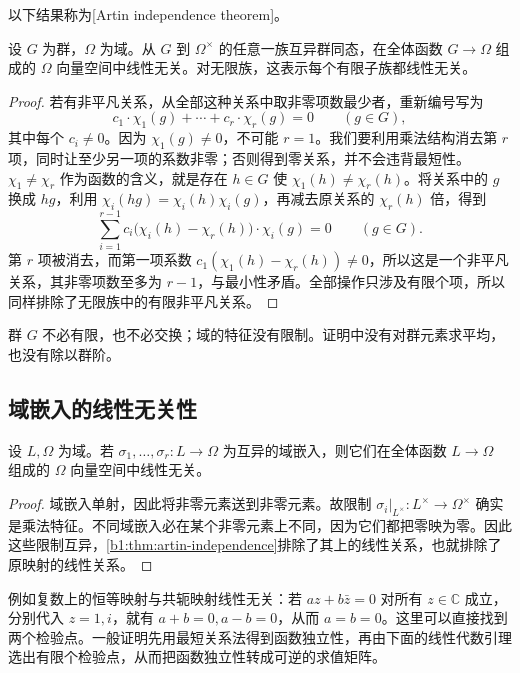 \ProseParagraphBreak
以下结果称为[Artin independence theorem]。
\begin{theorem}[Artin]\label{b1:thm:artin-independence}
	设 \(G\) 为群，\(\Omega\) 为域。从 \(G\) 到 \(\Omega^\times\) 的任意一族互异群同态，在全体函数 \(G\rightarrow\Omega\) 组成的 \(\Omega\) 向量空间中线性无关。对无限族，这表示每个有限子族都线性无关。
\end{theorem}
\begin{proof}
	若有非平凡关系，从全部这种关系中取非零项数最少者，重新编号写为
	\[
		c_1\cdot\chi_1(g)+\cdots+c_r\cdot\chi_r(g)=0\qquad(g\in G),
	\]
	其中每个 \(c_i\ne0\)。因为 \(\chi_1(g)\ne0\)，不可能 \(r=1\)。我们要利用乘法结构消去第 \(r\) 项，同时让至少另一项的系数非零；否则得到零关系，并不会违背最短性。\(\chi_1\ne\chi_r\) 作为函数的含义，就是存在 \(h\in G\) 使 \(\chi_1(h)\ne\chi_r(h)\)。将关系中的 \(g\) 换成 \(hg\)，利用 \(\chi_i(hg)=\chi_i(h)\chi_i(g)\)，再减去原关系的 \(\chi_r(h)\) 倍，得到
	\[
		\sum_{i=1}^{r-1}c_i\bigl(\chi_i(h)-\chi_r(h)\bigr)\cdot\chi_i(g)=0 \qquad(g\in G).
	\]
	第 \(r\) 项被消去，而第一项系数 \(c_1(\chi_1(h)-\chi_r(h))\ne0\)，所以这是一个非平凡关系，其非零项数至多为 \(r-1\)，与最小性矛盾。全部操作只涉及有限个项，所以同样排除了无限族中的有限非平凡关系。
\end{proof}
群 \(G\) 不必有限，也不必交换；域的特征没有限制。证明中没有对群元素求平均，也没有除以群阶。

\subsection{域嵌入的线性无关性}
\label{b1:subsec:1801:02}

\begin{corollary}\label{b1:cor:embedding-independence}
	设 \(L,\Omega\) 为域。若 \(\sigma_1,\ldots,\sigma_r:L\rightarrow\Omega\) 为互异的域嵌入，则它们在全体函数 \(L\rightarrow\Omega\) 组成的 \(\Omega\) 向量空间中线性无关。
\end{corollary}
\begin{proof}
	域嵌入单射，因此将非零元素送到非零元素。故限制 \(\sigma_i|_{L^\times}:L^\times\rightarrow\Omega^\times\) 确实是乘法特征。不同域嵌入必在某个非零元素上不同，因为它们都把零映为零。因此这些限制互异，\cref{b1:thm:artin-independence}排除了其上的线性关系，也就排除了原映射的线性关系。
\end{proof}
例如复数上的恒等映射与共轭映射线性无关：若 \(az+b\bar z=0\) 对所有 \(z\in\mathbb C\) 成立，分别代入 \(z=1,i\)，就有 \(a+b=0,a-b=0\)，从而 \(a=b=0\)。这里可以直接找到两个检验点。一般证明先用最短关系法得到函数独立性，再由下面的线性代数引理选出有限个检验点，从而把函数独立性转成可逆的求值矩阵。

